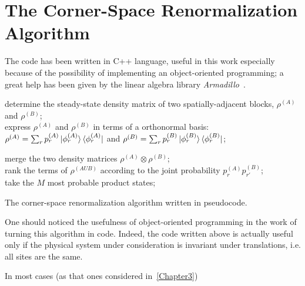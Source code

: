\chapter{The Corner-Space Renormalization Algorithm} %
\label{AppendixA}

The code has been written in C++ language, useful in this work especially because of the possibility of implementing an object-oriented programming; a great help has been given by the linear algebra library \emph{Armadillo}~\cite{arma:book, arma:art}. 

\begin{algorithm}

\SetAlgoLined
{}
{
determine the steady-state density matrix of two spatially-adjacent blocks, $\rho^{(A)}$ and $\rho^{(B)}$;\\
express $\rho^{(A)}$ and $\rho^{(B)}$ in terms of a orthonormal basis:
$\rho^{(A)} = \sum_r p_r^{(A)}\ket{\phi_r^{(A)}}\bra{\phi_r^{(A)}}$ and $\rho^{(B)} = \sum_r p_r^{(B)}\ket{\phi_r^{(B)}}\bra{\phi_r^{(B)}}$;


merge the two density matrices $\rho^{(A)} \otimes \rho^{(B)}$;\\
rank the terms of $\rho^{(AUB)}$ according to the joint probability $p_r^{(A)}p_{r'}^{(B)}$;\\
take the $M$ most probable product states;\\
}

\caption{The corner-space renormalization algorithm written in pseudocode.}
\label{pseudocode}
\end{algorithm}

One should noticed the usefulness of object-oriented programming in the work of turning this algorithm in code. Indeed, the code written above is actually useful only if the physical system under consideration is invariant under translations, i.e. all sites are the same.

In most cases (as that ones considered in~\ref{Chapter3}) 